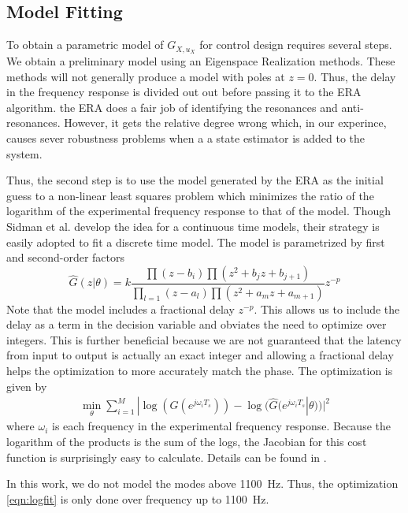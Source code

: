 \documentclass[journal,12pt,twocolumn,twoside]{IEEEtran/IEEEtran}
\begin{document}
\subsection{Model Fitting}
To obtain a parametric model of $G_{X,u_X}$ for control design requires several steps. We obtain a preliminary model using an Eigenspace Realization methods. These methods will not generally produce a model with poles at $z=0$. Thus, the delay in the frequency response is divided out out before passing it to the ERA algorithm. the ERA does a fair job of identifying the resonances and anti-resonances. However, it gets the relative degree wrong which, in our experince, causes sever robustness problems when a a state estimator is added to the system.

Thus, the second step is to use the model generated by the ERA as the initial guess to a non-linear least squares problem \cite{sidman_parametric_1991} which minimizes the ratio of the logarithm of the experimental frequency response to that of the model. Though Sidman et al. develop the idea for a continuous time models, their strategy is easily adopted to fit a discrete time model. The model is parametrized by first and second-order factors
\begin{equation}
  \hat{G}(z|\theta) =k \frac{\prod (z-b_i) \prod(z^2 +b_jz + b_{j+1})}
  { \prod_{l=1}(z-a_l) \prod(z^2 +a_mz + a_{m+1})}z^{-p}
\end{equation}
Note that the model includes a fractional delay $z^{-p}$. This allows us to include the delay as a term in the decision variable and obviates the need to optimize over integers. This is further beneficial because we are not guaranteed that the latency from input to output is actually an exact integer and allowing a fractional delay helps the optimization to more accurately match the phase. The optimization is given by
\begin{align}
\min_{\theta} \sum_{i=1}^M| \log(G(e^{j\omega_iT_s})) - \log(\hat{G}(e^{j\omega_iT_s}|\theta))|^2
\label{eqn:logfit}
\end{align}
where $\omega_i$ is each frequency in the experimental frequency response. Because the logarithm of the products is the sum of the logs, the Jacobian for this cost function is surprisingly easy to calculate. Details can be found in \cite{sidman_parametric_1991}.

In this work, we do not model the modes above 1100~Hz. Thus, the optimization \eqref{eqn:logfit} is only done over frequency up to 1100~Hz. 
\end{document}
